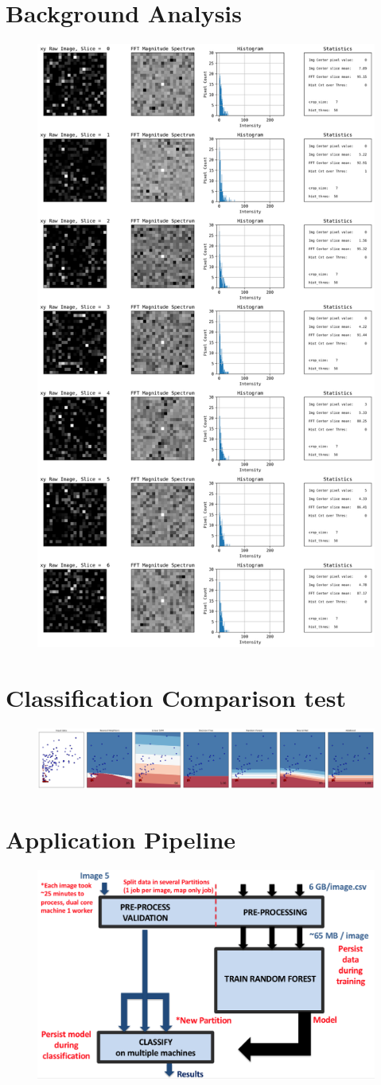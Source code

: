 \documentclass{neu_handout}
\begin{document}
\newpage

\section{Background Analysis}
\begin{figure}[!h]
  \includegraphics[width=0.65\linewidth]{background-xy-0}
  \label{fig:background-xy-0}
\end{figure}

\newpage

\section{Classification Comparison test}
\begin{figure}[!h]
  \includegraphics[width=1\linewidth]{classification-test}
  \label{fig:classification-test}
\end{figure}

\section{Application Pipeline}
\begin{figure}[!h]
  \includegraphics[width=0.7\linewidth]{pipeline}
  \label{fig:pipeline}
\end{figure}
\end{document}
